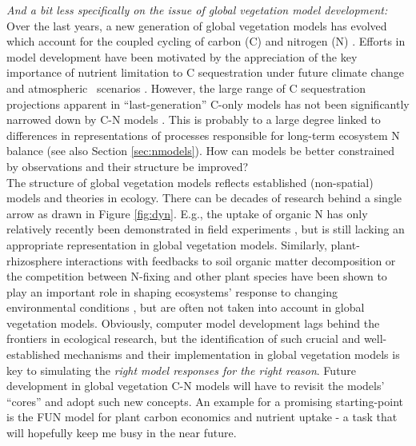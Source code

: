 {\it And a bit less specifically on the issue of global vegetation model development:}\\
Over the last years, a new generation of global vegetation models has
evolved which account for the coupled cycling of carbon (C) and
nitrogen (N) \citep{thornton07,xuri08gcb,jain09,zaehle10ocn1,esser11,gerber10}. Efforts
in model development have been motivated by the appreciation of the
key importance of nutrient limitation to C sequestration under future
climate change and atmospheric \coo\ scenarios
\citep{hungate03}. However, the large range of C sequestration
projections apparent in ``last-generation'' C-only models has not been
significantly narrowed down by C-N models \citep{zaehle13}. This is
probably to a large degree linked to
differences in representations of processes responsible for long-term
ecosystem N balance (see also Section \ref{sec:nmodels}). How can
models be better constrained by observations and their structure be
improved? \\

The structure of global vegetation models reflects established (non-spatial) models and
theories in ecology. There can be decades of research
behind a single arrow as drawn in Figure \ref{fig:dyn}. E.g., the
uptake of organic N has only relatively recently been demonstrated in field experiments
\citep{nasholm98}, but is still lacking an appropriate
representation in global vegetation models. Similarly,
plant-rhizosphere interactions with feedbacks to soil organic matter
decomposition or the competition between N-fixing and
other plant species have been shown to play an important role in
shaping ecosystems' response to changing environmental conditions
\citep{fontaine07,phillips13,hedin09}, but are often not taken into account in global vegetation
models. Obviously, computer model development lags behind the frontiers in ecological
research, but the identification of such crucial and well-established mechanisms and their implementation
in global vegetation models is key to simulating the
{\it right model responses for the right reason}. Future development
in global vegetation C-N models will have to revisit the models' ``cores''
and adopt such new concepts. An example for a promising starting-point
is the FUN model for plant carbon economics and nutrient uptake
\citep{fisher10} - a
task that will hopefully keep me busy in the near future.\\

